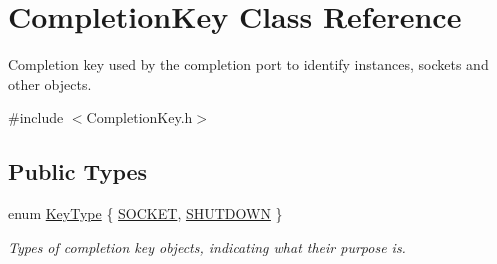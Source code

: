 \hypertarget{class_completion_key}{
\section{CompletionKey Class Reference}
\label{class_completion_key}
}


Completion key used by the completion port to identify instances, sockets and other objects.  




{\ttfamily \#include $<$CompletionKey.h$>$}

\subsection*{Public Types}
\begin{DoxyCompactItemize}
\item 
enum \hyperlink{class_completion_key_ad0789e8ca951edd8ee5b1b2fb7cdd8b4}{KeyType} \{ \hyperlink{class_completion_key_ad0789e8ca951edd8ee5b1b2fb7cdd8b4a935186545139a1c56403400651f6a25c}{SOCKET}, 
\hyperlink{class_completion_key_ad0789e8ca951edd8ee5b1b2fb7cdd8b4ac1d7e0bee4bbd1cd27869c1ad970dad8}{SHUTDOWN}
 \}
\begin{DoxyCompactList}\small\item\em Types of completion key objects, indicating what their purpose is. \item\end{DoxyCompactList}\end{DoxyCompactItemize}
